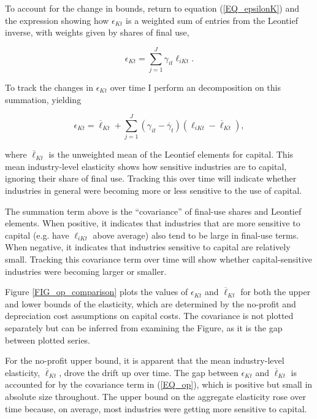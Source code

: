 \documentclass[11pt]{article}
\begin{document}
To account for the change in bounds, return to equation (\ref{EQ_epsilonK}) and the expression showing how $\epsilon_{Kt}$ is a weighted sum of entries from the Leontief inverse, with weights given by shares of final use,

\begin{equation}
	\epsilon_{Kt} = \sum_{j=1}^J \gamma_{it} \ell_{iKt}. \nonumber
\end{equation}

To track the changes in $\epsilon_{Kt}$ over time I perform an \cite{op1996} decomposition on this summation, yielding

\begin{equation}
	\epsilon_{Kt} = \overline{\ell}_{Kt} + \sum_{j=1}^J (\gamma_{it} - \overline{\gamma}_{t})(\ell_{iKt}-\overline{\ell}_{Kt}), \label{EQ_op}
\end{equation}

where $\overline{\ell}_{Kt}$ is the unweighted mean of the Leontief elements for capital. This mean industry-level elasticity shows how sensitive industries are to capital, ignoring their share of final use. Tracking this over time will indicate whether industries in general were becoming more or less sensitive to the use of capital.

The summation term above is the ``covariance'' of final-use shares and Leontief elements. When positive, it indicates that industries that are more sensitive to capital (e.g. have $\ell_{iKt}$ above average) also tend to be large in final-use terms. When negative, it indicates that industries sensitive to capital are relatively small. Tracking this covariance term over time will show whether capital-sensitive industries were becoming larger or smaller.

Figure \ref{FIG_op_comparison} plots the values of $\epsilon_{Kt}$ and $\overline{\ell}_{Kt}$ for both the upper and lower bounds of the elasticity, which are determined by the no-profit and depreciation cost assumptions on capital costs. The covariance is not plotted separately but can be inferred from examining the Figure, as it is the gap between plotted series. 

For the no-profit upper bound, it is apparent that the mean industry-level elasticity, $\overline{\ell}_{Kt}$, drove the drift up over time. The gap between $\epsilon_{Kt}$ and $\overline{\ell}_{Kt}$ is accounted for by the covariance term in (\ref{EQ_op}), which is positive but small in absolute size throughout. The upper bound on the aggregate elasticity rose over time because, on average, most industries were getting more sensitive to capital. 
\end{document}
